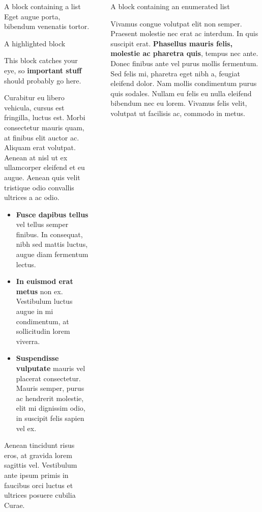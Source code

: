 \documentclass[final]{beamer}
\newlength{\sepwidth}
\newlength{\colwidth}
\newcommand{\separatorcolumn}{\begin{column}{\sepwidth}\end{column}}
\begin{document}
\begin{frame}[t]
\begin{columns}[t]
\begin{column}{\colwidth}
\begin{block}{A block containing a list}
        Eget augue porta, bibendum venenatis tortor.

      \end{block}

      \begin{alertblock}{A highlighted block}

        This block catches your eye, so \textbf{important stuff} should probably go
        here.

        Curabitur eu libero vehicula, cursus est fringilla, luctus est. Morbi
        consectetur mauris quam, at finibus elit auctor ac. Aliquam erat volutpat.
        Aenean at nisl ut ex ullamcorper eleifend et eu augue. Aenean quis velit
        tristique odio convallis ultrices a ac odio.

        \begin{itemize}
          \item \textbf{Fusce dapibus tellus} vel tellus semper finibus. In
                consequat, nibh sed mattis luctus, augue diam fermentum lectus.
          \item \textbf{In euismod erat metus} non ex. Vestibulum luctus augue in
                mi condimentum, at sollicitudin lorem viverra.
          \item \textbf{Suspendisse vulputate} mauris vel placerat consectetur.
                Mauris semper, purus ac hendrerit molestie, elit mi dignissim odio, in
                suscipit felis sapien vel ex.
        \end{itemize}

        Aenean tincidunt risus eros, at gravida lorem sagittis vel. Vestibulum ante
        ipsum primis in faucibus orci luctus et ultrices posuere cubilia Curae.

      \end{alertblock}

    \end{column}

    \separatorcolumn

    \begin{column}{\colwidth}

      \begin{block}{A block containing an enumerated list}

        Vivamus congue volutpat elit non semper. Praesent molestie nec erat ac
        interdum. In quis suscipit erat. \textbf{Phasellus mauris felis, molestie
          ac pharetra quis}, tempus nec ante. Donec finibus ante vel purus mollis
        fermentum. Sed felis mi, pharetra eget nibh a, feugiat eleifend dolor. Nam
        mollis condimentum purus quis sodales. Nullam eu felis eu nulla eleifend
        bibendum nec eu lorem. Vivamus felis velit, volutpat ut facilisis ac,
        commodo in metus.


\end{block}
\end{column}
\end{columns}
\end{frame}
\end{document}
